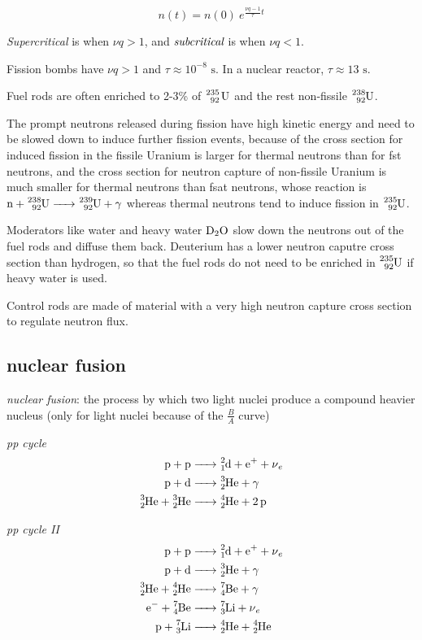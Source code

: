 \documentclass[10pt, a4paper, twocolumn]{article}
\newcommand{\deff}[1]{\par \noindent \textit{#1}: }
\begin{document}
\[n(t) = n(0)\ e^{\frac{\nu q -1}{\tau}t}\]

\emph{Supercritical} is when $\nu q>1$, and $\emph{subcritical}$ is when $\nu q<1$.

Fission bombs have $\nu q>1$ and $\tau \approx 10^{-8}\text{ s}$. In a nuclear reactor, $\tau \approx 13\text{ s}$.

Fuel rods are often enriched to 2-3\% of $\ce{^{235}_{92} U}$ and the rest non-fissile $\ce{^{238}_{92}U}$.

The prompt neutrons released during fission have high kinetic energy and need to be slowed down to induce further fission events, because of the cross section for induced fission in the fissile Uranium is larger for thermal neutrons than for fst neutrons, and the cross section for neutron capture of non-fissile Uranium is much smaller for thermal neutrons than fsat neutrons, whose reaction is
$\ce{n + ^{238}_{92}U -> ^{239}_{92}U + \gamma}$
whereas thermal neutrons tend to induce fission in $\ce{^{235}_{92}U}$.

Moderators like water and heavy water $\ce{D2O}$ slow down the neutrons out of the fuel rods and diffuse them back. Deuterium has a lower neutron caputre cross section than hydrogen, so that the fuel rods do not need to be enriched in $\ce{^{235}_{92}U}$ if heavy water is used.

Control rods are made of material with a very high neutron capture cross section to regulate neutron flux.

\subsection{nuclear fusion}

\deff{nuclear fusion}
the process by which two light nuclei produce a compound heavier nucleus (only for light nuclei because of the $\frac{B}{A}$ curve)

\emph{pp cycle}
\begin{equation*}
\begin{aligned}
\ce{
p + p &-> ^2_1d + e^+ +\nu _e
\\ p + d &-> ^3_2He + \gamma
\\ ^3_2He + ^3_2He &-> ^4_2He + 2p
}
\end{aligned}
\end{equation*}

\emph{pp cycle II}
\begin{equation*}
\begin{aligned}
\ce{
p + p &-> ^2_1d + e^+ +\nu _e
\\ p + d &-> ^3_2He + \gamma
\\ ^3_2He + ^4_2He &-> ^7_4Be + \gamma
\\ e^- + ^7_4Be &-> ^7_3Li + \nu _e
\\ p + ^7_3Li &-> ^4_2He + ^4_2He
}
\end{aligned}
\end{equation*}
\end{document}
